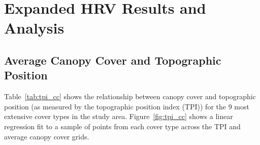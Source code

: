 \chapter{Expanded HRV Results and Analysis}
\label{app:full-results}

\section{Average Canopy Cover and Topographic Position}
Table~\ref{tab:tpi_cc} shows the relationship between canopy cover and topographic position (as measured by the topographic position index (TPI)) for the 9 most extensive cover types in the study area. Figure~\ref{fig:tpi_cc} shows a linear regression fit to a sample of points from each cover type across the TPI and average canopy cover grids.

